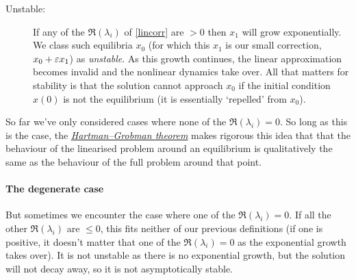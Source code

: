 \documentclass[main.tex]{subfiles}
\begin{document}
\begin{description}
	\item[Unstable:]
	If any of the $\Re(\lambda_i)$ of \cref{lincorr} are $>0$ then $x_1$ will grow exponentially. We class such equilibria $x_0$ (for which this $x_1$ is our small correction, $x_0+\varepsilon x_1$) as \emph{unstable}. As this growth continues, the linear approximation becomes invalid and the nonlinear dynamics take over. All that matters for stability is that the solution cannot approach $x_0$ if the initial condition $x(0)$ is not the equilibrium (it is essentially `repelled' from $x_0$).
\end{description}

\begin{nem}
So far we've only considered cases where none of the $\Re(\lambda_i) = 0$. So long as this is the case, the \href{https://en.wikipedia.org/wiki/Hartman–Grobman_theorem}{\emph{Hartman--Grobman theorem}} makes rigorous this idea that that the behaviour of the linearised problem around an equilibrium is qualitatively the same as the behaviour of the full problem around that point. 
\end{nem}

\paragraph{The degenerate case}
But sometimes we encounter the case where one of the $\Re(\lambda_i)=0$. If all the other $\Re(\lambda_i)$ are $\leq 0$, this fits neither of our previous definitions (if one is positive, it doesn't matter that one of the $\Re(\lambda_i)=0$ as the exponential growth takes over). It is not unstable as there is no exponential growth, but the solution will not decay away, so it is not asymptotically stable. 
\end{document}
